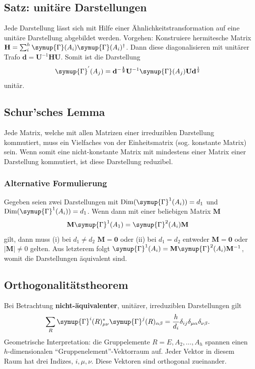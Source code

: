 \documentclass[
  captions=tableheading,  %
  titlepage=firstiscover, %
]{scrartcl}
\begin{document}
\subsection{Satz: unitäre Darstellungen}
Jede Darstellung lässt sich mit Hilfe einer Ähnlichkeitstransformation auf eine 
unitäre Darstellung abgebildet werden. Vorgehen: Konstruiere hermitesche Matrix 
${\mathbf{H} = \sum_i^h \symup{\Gamma}(A_i) \symup{\Gamma} (A_i)^\dagger}$. Dann diese diagonalisieren mit unitärer Trafo 
$\mathbf{d} = \mathbf{U}^{-1} \mathbf{H} \mathbf{U}$. Somit ist
die Darstellung 
\begin{equation*}
  \symup{\Gamma}^{'}(A_j) = \mathbf{d^{-\frac{1}{2}}} \mathbf{U}^{-1} \symup{\Gamma}(A_j) \mathbf{U} \mathbf{d}^{\frac{1}{2}}
\end{equation*}
unitär.
\subsection{Schur'sches Lemma}
Jede Matrix, welche mit allen Matrizen einer irreduziblen Darstellung kommutiert,
muss ein Vielfaches von der Einheitsmatrix (sog. konstante Matrix) sein. 
Wenn somit eine nicht-konstante Matrix mit mindestens einer Matrix einer Darstellung kommutiert, 
ist diese Darstellung reduzibel.
\subsubsection{Alternative Formulierung}
Gegeben seien zwei Darstellungen mit $\text{Dim}(\symup{\Gamma}^1(A_i)) = d_1$ und $\text{Dim}(\symup{\Gamma}^1(A_i)) = d_1$.
Wenn dann mit einer beliebigen Matrix $\mathbf{M}$
\begin{equation*}
  \mathbf{M}\symup{\Gamma}^1(A_1) = \symup{\Gamma}^2(A_i) \mathbf{M}
\end{equation*}
gilt, dann muss (i) bei $d_1 \neq d_2$ $\mathbf{M} = \mathbf{0}$ oder (ii) bei $d_1 = d_2$ entweder 
$\mathbf{M} = \mathbf{0}$ oder $|\mathbf{M}| \neq 0$ gelten.
Aus letzterem folgt $\symup{\Gamma}^1(A_i) = \mathbf{M} \symup{\Gamma}^2(A_i) \mathbf{M}^{-1} $, womit 
die Darstellungen äquivalent sind.
\subsection{Orthogonalitätstheorem}
\label{sub:orth}
Bei Betrachtung \textbf{nicht-äquivalenter}, unitärer, irreduziblen Darstellungen gilt
\begin{equation*}
  \sum_R \symup{\Gamma}^i(R)^*_{\mu \nu}\symup{\Gamma}^j(R)_{\alpha \beta} = \frac{h}{d_i} \delta_{ij}\delta_{\mu \alpha}\delta_{\nu \beta}.
\end{equation*}
Geometrische Interpretation: die Gruppelemente $R = E, A_2, \ldots, A_h$ spannen einen 
$h$-dimensionalen \enquote{Gruppenelement}-Vektorraum auf.
Jeder Vektor in diesem Raum hat drei Indizes, $i, \mu, \nu$.
Diese Vektoren sind orthogonal zueinander.
\end{document}
